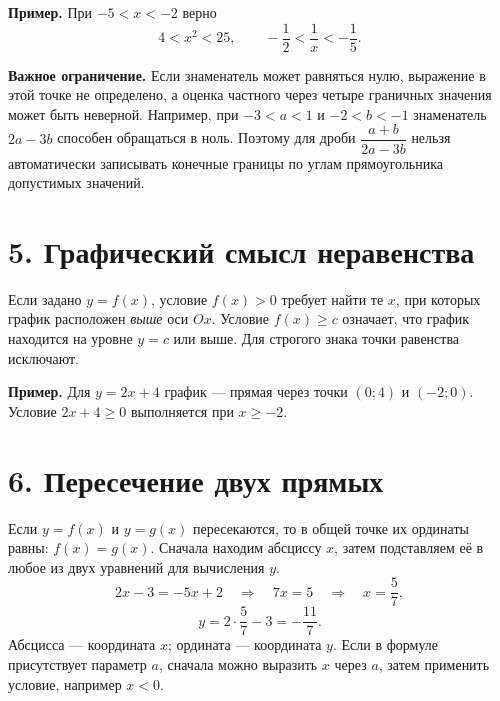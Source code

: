 \documentclass[a4paper,12pt]{article}
\newcommand{\chap}[1]{\needspace{7\baselineskip}\section*{\color{darkaccent}#1}}
\newcommand{\ex}[1]{\par\smallskip\textcolor{darkaccent}{\textbf{Пример.}} #1\par}
\begin{document}
\ex{При $-5<x<-2$ верно
\[
4<x^2<25,\qquad -\frac12<\frac1x<-\frac15.
\]}

\textcolor{accent}{\textbf{Важное ограничение.}} Если знаменатель может равняться нулю, выражение в этой точке не определено, а оценка частного через четыре граничных значения может быть неверной. Например, при $-3<a<1$ и $-2<b<-1$ знаменатель $2a-3b$ способен обращаться в ноль. Поэтому для дроби $\dfrac{a+b}{2a-3b}$ нельзя автоматически записывать конечные границы по углам прямоугольника допустимых значений.

\chap{5. Графический смысл неравенства}
Если задано $y=f(x)$, условие $f(x)>0$ требует найти те $x$, при которых график расположен \emph{выше} оси $Ox$. Условие $f(x)\ge c$ означает, что график находится на уровне $y=c$ или выше. Для строгого знака точки равенства исключают.

\ex{Для $y=2x+4$ график --- прямая через точки $(0;4)$ и $(-2;0)$. Условие $2x+4\ge0$ выполняется при $x\ge-2$.}
\begin{center}
\end{center}
\clearpage

\chap{6. Пересечение двух прямых}
Если $y=f(x)$ и $y=g(x)$ пересекаются, то в общей точке их ординаты равны: $f(x)=g(x)$. Сначала находим абсциссу $x$, затем подставляем её в любое из двух уравнений для вычисления $y$.
\[
2x-3=-5x+2\quad\Longrightarrow\quad 7x=5\quad\Longrightarrow\quad x=\frac57,
\]
\[
y=2\cdot\frac57-3=-\frac{11}{7}.
\]
Абсцисса --- координата $x$; ордината --- координата $y$. Если в формуле присутствует параметр $a$, сначала можно выразить $x$ через $a$, затем применить условие, например $x<0$.
\end{document}
